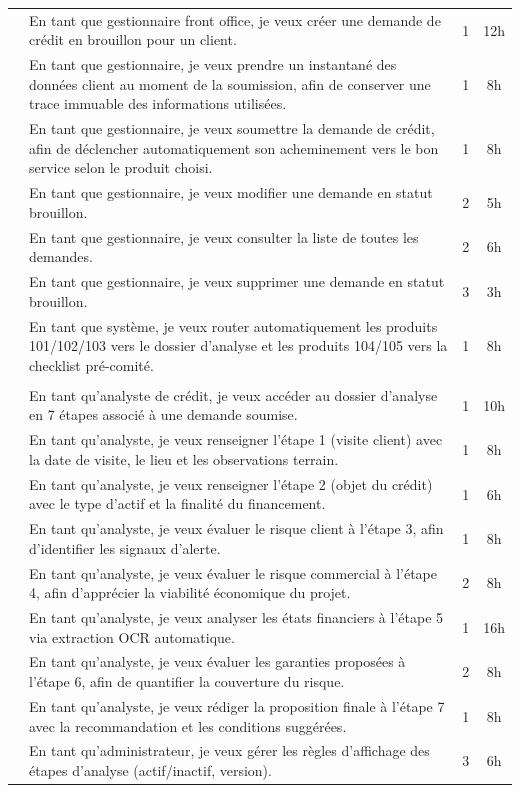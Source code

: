\begin{longtable}{|>{\centering\arraybackslash}p{2.8cm}|>{\raggedright\arraybackslash}p{8.5cm}|c|c|}
\multicolumn{4}{|l|}{\cellcolor{gray!20}\textbf{Sprint 2 : Service de Demande de Crédit}} \\ \hline
& En tant que gestionnaire front office, je veux créer une demande de crédit en brouillon pour un client. & 1 & 12h \\ \hline
& En tant que gestionnaire, je veux prendre un instantané des données client au moment de la soumission, afin de conserver une trace immuable des informations utilisées. & 1 & 8h \\ \hline
& En tant que gestionnaire, je veux soumettre la demande de crédit, afin de déclencher automatiquement son acheminement vers le bon service selon le produit choisi. & 1 & 8h \\ \hline
& En tant que gestionnaire, je veux modifier une demande en statut brouillon. & 2 & 5h \\ \hline
& En tant que gestionnaire, je veux consulter la liste de toutes les demandes. & 2 & 6h \\ \hline
& En tant que gestionnaire, je veux supprimer une demande en statut brouillon. & 3 & 3h \\ \hline
& En tant que système, je veux router automatiquement les produits 101/102/103 vers le dossier d'analyse et les produits 104/105 vers la checklist pré-comité. & 1 & 8h \\ \hline

\multicolumn{4}{|l|}{\cellcolor{gray!20}\textbf{Sprint 3 : Service d'Analyse}} \\ \hline
& En tant qu'analyste de crédit, je veux accéder au dossier d'analyse en 7 étapes associé à une demande soumise. & 1 & 10h \\ \hline
& En tant qu'analyste, je veux renseigner l'étape 1 (visite client) avec la date de visite, le lieu et les observations terrain. & 1 & 8h \\ \hline
& En tant qu'analyste, je veux renseigner l'étape 2 (objet du crédit) avec le type d'actif et la finalité du financement. & 1 & 6h \\ \hline
& En tant qu'analyste, je veux évaluer le risque client à l'étape 3, afin d'identifier les signaux d'alerte. & 1 & 8h \\ \hline
& En tant qu'analyste, je veux évaluer le risque commercial à l'étape 4, afin d'apprécier la viabilité économique du projet. & 2 & 8h \\ \hline
& En tant qu'analyste, je veux analyser les états financiers à l'étape 5 via extraction OCR automatique. & 1 & 16h \\ \hline
& En tant qu'analyste, je veux évaluer les garanties proposées à l'étape 6, afin de quantifier la couverture du risque. & 2 & 8h \\ \hline
& En tant qu'analyste, je veux rédiger la proposition finale à l'étape 7 avec la recommandation et les conditions suggérées. & 1 & 8h \\ \hline
& En tant qu'administrateur, je veux gérer les règles d'affichage des étapes d'analyse (actif/inactif, version). & 3 & 6h \\ \hline


\end{longtable}
